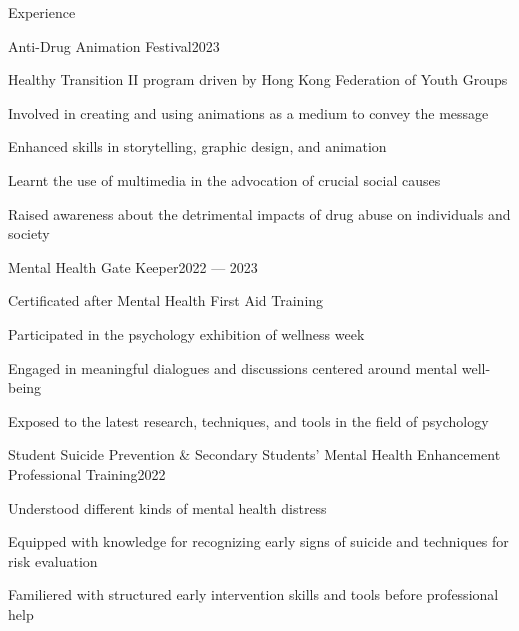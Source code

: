\documentclass[
	11pt, %
]{resume} %
\begin{document}
\begin{rSection}{Experience}


    \begin{rSubsection}{Anti-Drug Animation Festival}{2023}{}{}
        \item Healthy Transition II program driven by Hong Kong Federation of Youth Groups
        \item Involved in creating and using animations as a medium to convey the message
        \item Enhanced skills in storytelling, graphic design, and animation
        \item Learnt the use of multimedia in the advocation of crucial social causes
        \item Raised awareness about the detrimental impacts of drug abuse on individuals and society
    \end{rSubsection}

    \begin{rSubsection}{Mental Health Gate Keeper}{2022 --- 2023}{}{}
        \item Certificated after Mental Health First Aid Training
        \item Participated in the psychology exhibition of wellness week
        \item Engaged in meaningful dialogues and discussions centered around mental well-being
        \item Exposed to the latest research, techniques, and tools in the field of psychology
    \end{rSubsection}

    \begin{rSubsection}{Student Suicide Prevention \& Secondary Students' Mental Health Enhancement Professional Training}{2022}{}{}
        \item Understood different kinds of mental health distress
        \item Equipped with knowledge  for recognizing early signs of suicide and techniques for risk evaluation
        \item Familiered with structured early intervention skills and tools before professional help
    \end{rSubsection}


\end{rSection}
\end{document}
